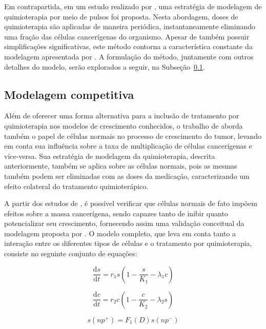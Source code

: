 \documentclass[12pt]{article}
\begin{document}
Em contrapartida, em um estudo realizado por \cite{Panetta1996}, uma estratégia de modelagem de quimioterapia por meio de pulsos foi proposta. Nesta abordagem, doses de quimioterapia são aplicadas de maneira periódica, instantaneamente eliminando uma fração das células cancerígenas do organismo. Apesar de também possuir simplificações significativas, este método contorna a característica constante da modelagem apresentada por \cite{Enderling2014}. A formulação do método, juntamente com outros detalhes do modelo, serão explorados a seguir, na Subseção~\ref{sec:competition}.

\subsection{Modelagem competitiva} \label{sec:competition}

Além de oferecer uma forma alternativa para a inclusão de tratamento por quimioterapia nos modelos de crescimento conhecidos, o trabalho de \cite{Panetta1996} aborda também o papel de células normais no processo de crescimento do tumor, levando em conta sua influência sobre a taxa de multiplicação de células cancerígenas e vice-versa. Sua estratégia de modelagem da quimioterapia, descrita anteriormente, também se aplica sobre as células normais, pois as mesmas também podem ser eliminadas com as doses da medicação, caracterizando um efeito colateral do tratamento quimioterápico.

A partir dos estudos de \cite{Cornil1991}, é possível verificar que células normais de fato impõem efeitos sobre a massa cancerígena, sendo capazes tanto de inibir quanto potencializar seu crescimento, fornecendo assim uma validação conceitual da modelagem proposta por \cite{Panetta1996}. O modelo completo, que leva em conta tanto a interação entre os diferentes tipos de células e o tratamento por quimioterapia, consiste no seguinte conjunto de equações:

\begin{equation} \label{eq:normalgrowth}
  \frac{\mathrm{d} s}{\mathrm{d} t} = r_{1} s \left ( 1 - \frac{s}{K_1} - \lambda_{1} c \right )
\end{equation}

\begin{equation} \label{eq:cancergrowth}
  \frac{\mathrm{d} c}{\mathrm{d} t} = r_{2} c \left ( 1 - \frac{c}{K_2} - \lambda_{2} s \right )
\end{equation}

\begin{equation} \label{eq:normalchemo}
  s(np^{+}) = F_{1}(D) s(np^{-})
\end{equation}
\end{document}

